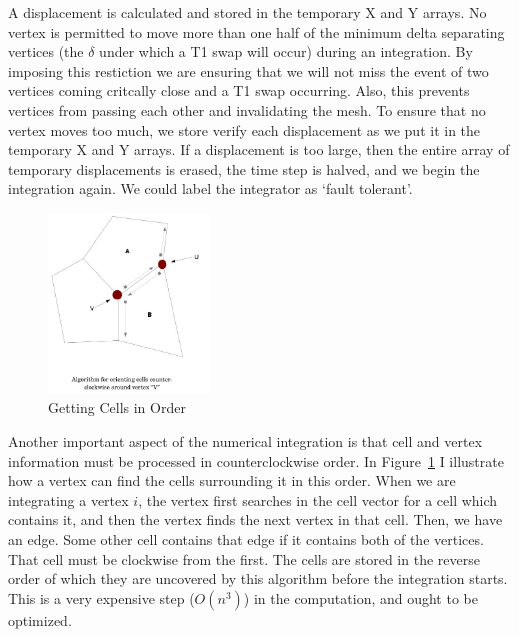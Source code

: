 A displacement is calculated and stored in the temporary X and Y arrays. No vertex is permitted to move more than one half of the minimum delta separating vertices (the $\delta$ under which a T1 swap will occur) during an integration. By imposing this restiction we are ensuring that we will not miss the event of two vertices coming critcally close and a T1 swap occurring. Also, this prevents vertices from passing each other and invalidating the mesh. To ensure that no vertex moves too much, we store verify each displacement as we put it in the temporary X and Y arrays. If a displacement is too large, then the entire array of temporary displacements is erased, the time step is halved, and we begin the integration again. We could label the integrator as `fault tolerant'.

\begin{figure}
\begin{center}
\includegraphics[width=0.38\textwidth]{../diagrams/counterclockwise.jpg}
\end{center}
\caption{Getting Cells in Order}
\label{fig:ctrclockwise}
\end{figure}

Another important aspect of the numerical integration is that cell and vertex information must be processed in counterclockwise order. In Figure~\ref{fig:ctrclockwise} I illustrate how a vertex can find the cells surrounding it in this order. When we are integrating a vertex $i$, the vertex first searches in the cell vector for a cell which contains it, and then the vertex finds the next vertex in that cell. Then, we have an edge. Some other cell contains that edge if it contains both of the vertices. That cell must be clockwise from the first. The cells are stored in the reverse order of which they are uncovered by this algorithm before the integration starts. This is a very expensive step ($O(n^3)$) in the computation, and ought to be optimized.


